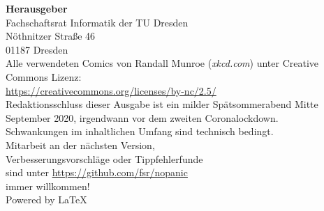 \newpage
\thispagestyle{empty} %
\color{white}

\begin{minipage}[t][\textheight][b]{.65\textwidth}
\footnotesize
\textbf{Herausgeber} \\
Fachschaftsrat Informatik der TU Dresden\\
Nöthnitzer Straße 46\\
01187 Dresden\\[1\baselineskip]

Alle verwendeten Comics von Randall Munroe (\textit{xkcd.com}) unter Creative Commons Lizenz:\\
\url{https://creativecommons.org/licenses/by-nc/2.5/}\\[1\baselineskip]

Redaktionsschluss dieser Ausgabe ist ein milder Spätsommerabend Mitte September 2020, irgendwann vor dem zweiten Coronalockdown.\\%
Schwankungen im inhaltlichen Umfang sind technisch bedingt.\\[1\baselineskip]

Mitarbeit an der nächsten Version,\\
Verbesserungsvorschläge oder Tippfehlerfunde\\
sind unter \url{https://github.com/fsr/nopanic}\\
immer willkommen!\\[1\baselineskip]

Powered by \LaTeX
\end{minipage}%
\hfill%
